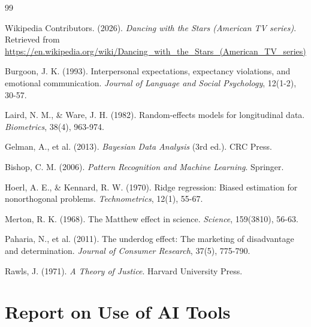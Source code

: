 \documentclass[12pt]{article}
\begin{document}
\begin{thebibliography}{99}
	
	Wikipedia Contributors. (2026). \textit{Dancing with the Stars (American TV series)}. Retrieved from \url{https://en.wikipedia.org/wiki/Dancing_with_the_Stars_(American_TV_series)}
	
	Burgoon, J. K. (1993). Interpersonal expectations, expectancy violations, and emotional communication. \textit{Journal of Language and Social Psychology}, 12(1-2), 30-57.
	
	Laird, N. M., \& Ware, J. H. (1982). Random-effects models for longitudinal data. \textit{Biometrics}, 38(4), 963-974. 
	
	Gelman, A., et al. (2013). \textit{Bayesian Data Analysis} (3rd ed.). CRC Press.
	
	
	Bishop, C. M. (2006). \textit{Pattern Recognition and Machine Learning}. Springer.
	
	Hoerl, A. E., \& Kennard, R. W. (1970). Ridge regression: Biased estimation for nonorthogonal problems. \textit{Technometrics}, 12(1), 55-67.
	
	
	Merton, R. K. (1968). The Matthew effect in science. \textit{Science}, 159(3810), 56-63.
	
	Paharia, N., et al. (2011). The underdog effect: The marketing of disadvantage and determination. \textit{Journal of Consumer Research}, 37(5), 775-790.
	
	Rawls, J. (1971). \textit{A Theory of Justice}. Harvard University Press.
	
\end{thebibliography}
\clearpage

\section*{Report on Use of AI Tools}
\end{document}
